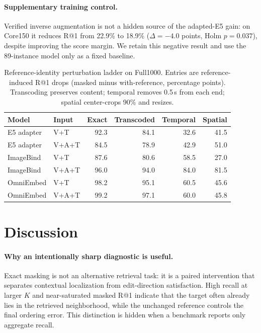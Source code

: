 \documentclass[letterpaper]{article}
\begin{document}
\paragraph{Supplementary training control.}
Verified inverse augmentation is not a hidden source of the adapted-E5 gain: on Core150 it reduces R@1 from 22.9\% to 18.9\% ($\Delta=-4.0$ points, Holm $p=0.037$), despite improving the score margin. We retain this negative result and use the 89-instance model only as a fixed baseline.

\begin{table}[t]
\centering
\small
\setlength{\tabcolsep}{6.0pt}
\caption{Reference-identity perturbation ladder on Full1000. Entries are reference-induced R@1 drops (masked minus with-reference, percentage points). Transcoding preserves content; temporal removes 0.5\,s from each end; spatial center-crops 90\% and resizes.}
\label{tab:reference-ladder}
\begin{tabular}{llrrrr}
\toprule
Model & Input & Exact & Transcoded & Temporal & Spatial \\
\midrule
E5 adapter & V+T & 92.3 & 84.1 & 32.6 & 41.5 \\
E5 adapter & V+A+T & 84.5 & 78.9 & 42.9 & 51.0 \\
ImageBind & V+T & 87.6 & 80.6 & 58.5 & 27.0 \\
ImageBind & V+A+T & 96.0 & 94.0 & 84.0 & 81.5 \\
OmniEmbed & V+T & 98.2 & 95.1 & 60.5 & 45.6 \\
OmniEmbed & V+A+T & 99.2 & 97.1 & 60.0 & 45.8 \\
\bottomrule
\end{tabular}
\end{table}

\section{Discussion}

\paragraph{Why an intentionally sharp diagnostic is useful.}
Exact masking is not an alternative retrieval task: it is a paired intervention that separates contextual localization from edit-direction satisfaction.
High recall at larger $K$ and near-saturated masked R@1 indicate that the target often already lies in the retrieved neighborhood, while the unchanged reference controls the final ordering error.
This distinction is hidden when a benchmark reports only aggregate recall.
\end{document}
